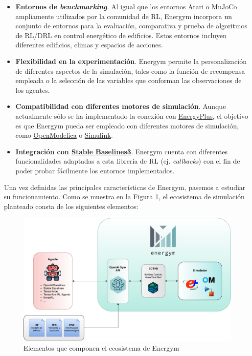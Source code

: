 \begin{itemize}
    \item \textbf{Entornos de \textit{benchmarking}}. Al igual que los entornos \href{https://gym.openai.com/envs/\#atari}{Atari} o \href{https://gym.openai.com/envs/\#mujoco}{MuJoCo} ampliamente utilizados por la comunidad de RL, Energym incorpora un conjunto de entornos para la evaluación, comparativa y prueba de algoritmos de RL/DRL en control energético de edificios. Estos entornos incluyen diferentes edificios, climas y espacios de acciones.
    \item \textbf{Flexibilidad en la experimentación}. Energym permite la personalización de diferentes aspectos de la simulación, tales como la función de recompensa empleada o la selección de las variables que conforman las observaciones de los agentes.
    \item \textbf{Compatibilidad con diferentes motores de simulación}. Aunque actualmente sólo se ha implementado la conexión con \href{https://energyplus.net/}{EnergyPlus}, el objetivo es que Energym pueda ser empleado con diferentes motores de simulación, como \href{https://www.openmodelica.org/}{OpenModelica} o \href{https://es.mathworks.com/products/simulink.html}{Simulink}.
    \item \textbf{Integración con \href{https://stable-baselines3.readthedocs.io}{Stable Baselines3}}. Energym cuenta con diferentes funcionalidades adaptadas a esta librería de RL (ej. \textit{callbacks}) con el fin de poder probar fácilmente los entornos implementados.
\end{itemize}

Una vez definidas las principales características de Energym, pasemos a estudiar su funcionamiento. Como se muestra en la Figura \ref{fig:energym-ecosystem}, el ecosistema de simulación planteado consta de los siguientes elementos:

\begin{figure}
    \centering
    \includegraphics[width=\textwidth]{imagenes/energym-diagram.pdf}
    \caption{Elementos que componen el ecosistema de Energym}
    \label{fig:energym-ecosystem}
\end{figure}

